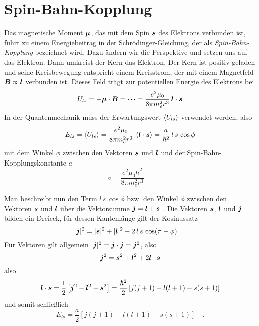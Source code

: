 \section{Spin-Bahn-Kopplung}

Das magnetische Moment $\boldsymbol{\mu}$, das mit dem Spin $\boldsymbol{s}$ des Elektrons verbunden ist, führt zu einem Energiebeitrag in der Schrödinger-Gleichung, der als \emph{Spin-Bahn-Kopplung} bezeichnet wird. Dazu ändern wir die Perspektive und setzen uns auf das Elektron. Dann umkreist der Kern das Elektron. Der Kern ist positiv geladen und seine Kreisbewegung entspricht einem Kreisstrom, der mit einem Magnetfeld $\boldsymbol{B} \propto \boldsymbol{l}$ verbunden ist. Dieses Feld trägt zur potentiellen Energie des Elektrons bei
\begin{equation}
    U_{ls} = - \boldsymbol{\mu} \cdot \boldsymbol{B} = \cdots = \frac{e^2 \mu_0}{8 \pi m_e^2 r^3} \, \boldsymbol{l} \cdot \boldsymbol{s}
\end{equation}
In der Quantenmechanik muss der Erwartungswert $\braket{U_{ls}}$ verwendet werden, also
\begin{equation}
    E_{ls} = \braket{U_{ls}} = \frac{e^2 \mu_0}{8 \pi m_e^2 r^3} \, \braket{\boldsymbol{l} \cdot \boldsymbol{s}}
    = \frac{a}{\hbar^2} \, l \, s \, \cos \phi
\end{equation}
mit dem Winkel $\phi$ zwischen den Vektoren $\boldsymbol{s}$ und $\boldsymbol{l}$ und der Spin-Bahn-Kopplungskonstante $a$
\begin{equation}
    a = \frac{e^2 \mu_0 \hbar^2}{8 \pi m_e^2 r^3} \quad . 
\end{equation}

Man beschreibt nun den Term $l \, s \, \cos \phi$ bzw. den Winkel $\phi$ zwischen den Vektoren $\boldsymbol{s}$ und $\boldsymbol{l}$ über die Vektorsumme $\boldsymbol{j} = \boldsymbol{l} + \boldsymbol{s}$ . Die Vektoren $\boldsymbol{s}$, $\boldsymbol{l}$ und $\boldsymbol{j}$ bilden ein Dreieck, für dessen Kantenlänge gilt
der Kosinussatz
\begin{equation}
    |\boldsymbol{j}|^2 =   |\boldsymbol{s}|^2 +   |\boldsymbol{l}|^2  - 2 \, l \, s \, \cos (\pi - \phi) \quad .
\end{equation}
Für Vektoren gilt allgemein $|\boldsymbol{j}|^2  = \boldsymbol{j} \cdot \boldsymbol{j} = \boldsymbol{j}^2$, also 
\begin{equation}
    \boldsymbol{j}^2 =   \boldsymbol{s}^2 +   \boldsymbol{l}^2  + 2  \boldsymbol{l} \cdot \boldsymbol{s}
\end{equation}
also
\begin{equation}
    \boldsymbol{l} \cdot \boldsymbol{s} = \frac{1}{2} \left[ \boldsymbol{j}^2 -  \boldsymbol{l}^2 -   \boldsymbol{s}^2   \right]
    = \frac{\hbar^2}{2} \left[ j(j+1) - l(l+1) - s(s+1) \right]
\end{equation}
und somit schließlich
\begin{equation}
    E_{ls}     = \frac{a}{2}  \left[ j(j+1) - l(l+1) - s(s+1) \right] \quad . 
    \label{eq:5_FS_ls}
\end{equation}

